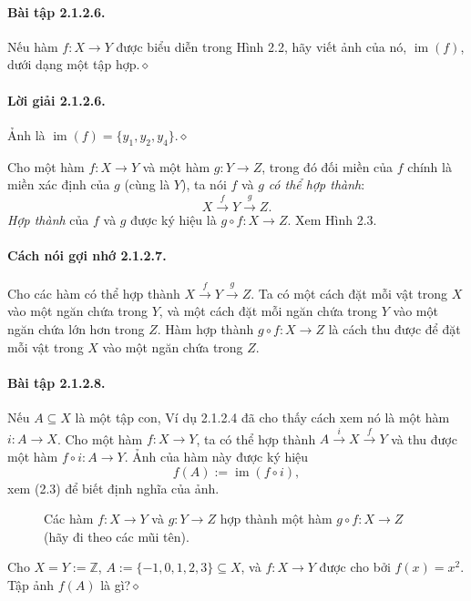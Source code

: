 \paragraph{Bài tập 2.1.2.6.} Nếu hàm $f:X\to Y$ được biểu diễn trong Hình 2.2, hãy viết ảnh của nó, $\operatorname{im}(f)$, dưới dạng một tập hợp.\hfill$\diamond$
\paragraph{Lời giải 2.1.2.6.} Ảnh là $\operatorname{im}(f)=\{y_1,y_2,y_4\}$.\hfill$\diamond$

Cho một hàm $f:X\to Y$ và một hàm $g:Y\to Z$, trong đó đối miền của $f$ chính là miền xác định của $g$ (cùng là $Y$), ta nói $f$ và $g$ \emph{có thể hợp thành}:
\[X\xrightarrow{f}Y\xrightarrow{g}Z.\]
\emph{Hợp thành} của $f$ và $g$ được ký hiệu là $g\circ f:X\to Z$. Xem Hình 2.3.
\paragraph{Cách nói gợi nhớ 2.1.2.7.} Cho các hàm có thể hợp thành $X\xrightarrow{f}Y\xrightarrow{g}Z$. Ta có một cách đặt mỗi vật trong $X$ vào một ngăn chứa trong $Y$, và một cách đặt mỗi ngăn chứa trong $Y$ vào một ngăn chứa lớn hơn trong $Z$. Hàm hợp thành $g\circ f:X\to Z$ là cách thu được để đặt mỗi vật trong $X$ vào một ngăn chứa trong $Z$.
\paragraph{Bài tập 2.1.2.8.} Nếu $A\subseteq X$ là một tập con, Ví dụ 2.1.2.4 đã cho thấy cách xem nó là một hàm $i:A\to X$. Cho một hàm $f:X\to Y$, ta có thể hợp thành $A\xrightarrow{i}X\xrightarrow{f}Y$ và thu được một hàm $f\circ i:A\to Y$. Ảnh của hàm này được ký hiệu
\[f(A):=\operatorname{im}(f\circ i),\]
xem (2.3) để biết định nghĩa của ảnh.
\begin{figure}[htbp]\centering
{}
\caption{Các hàm $f:X\to Y$ và $g:Y\to Z$ hợp thành một hàm $g\circ f:X\to Z$ (hãy đi theo các mũi tên).}\label{fig:2-3}
\end{figure}
Cho $X=Y:=\mathbb Z$, $A:=\{-1,0,1,2,3\}\subseteq X$, và $f:X\to Y$ được cho bởi $f(x)=x^2$. Tập ảnh $f(A)$ là gì?\hfill$\diamond$
